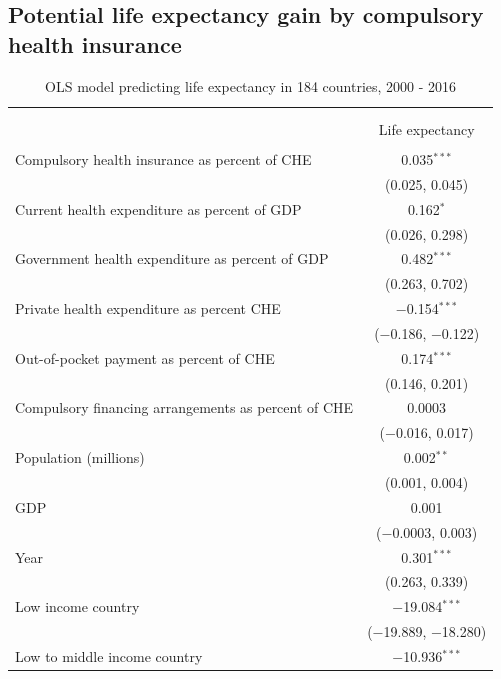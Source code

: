 \documentclass[]{elsarticle} %
\begin{document}
\hypertarget{potential-life-expectancy-gain-by-compulsory-health-insurance}{%
\subsection{Potential life expectancy gain by compulsory health insurance}\label{potential-life-expectancy-gain-by-compulsory-health-insurance}}

\begin{table}[H] \centering 
  \caption{OLS model predicting life expectancy in 184 countries, 2000 - 2016} 
  \label{poolOLS} 
\begin{tabular}{@{\extracolsep{5pt}}lc} 
\\[-1.8ex]\hline \\[-1.8ex] 
\\[-1.8ex] & Life expectancy \\ 
\hline \\[-1.8ex] 
 Compulsory health insurance as percent of CHE & 0.035$^{***}$ \\ 
  & (0.025, 0.045) \\ 
  Current health expenditure as percent of GDP & 0.162$^{*}$ \\ 
  & (0.026, 0.298) \\ 
  Government health expenditure as percent of GDP & 0.482$^{***}$ \\ 
  & (0.263, 0.702) \\ 
  Private health expenditure as percent CHE & $-$0.154$^{***}$ \\ 
  & ($-$0.186, $-$0.122) \\ 
  Out-of-pocket payment as percent of CHE & 0.174$^{***}$ \\ 
  & (0.146, 0.201) \\ 
  Compulsory financing arrangements as percent of CHE & 0.0003 \\ 
  & ($-$0.016, 0.017) \\ 
  Population (millions) & 0.002$^{**}$ \\ 
  & (0.001, 0.004) \\ 
  GDP & 0.001 \\ 
  & ($-$0.0003, 0.003) \\ 
  Year & 0.301$^{***}$ \\ 
  & (0.263, 0.339) \\ 
  Low income country & $-$19.084$^{***}$ \\ 
  & ($-$19.889, $-$18.280) \\ 
  Low to middle income country & $-$10.936$^{***}$ \\ 

\end{tabular}
\end{table}
\end{document}
